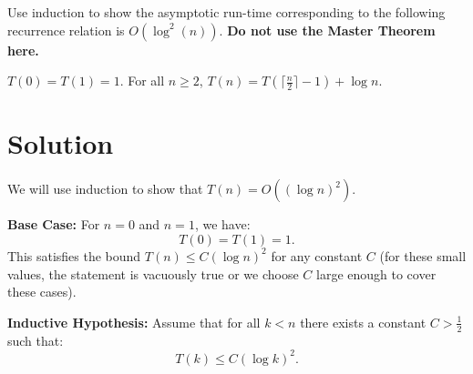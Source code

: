 \documentclass[11pt]{article}
\begin{document}
    \setlength{\headheight}{26pt}
    \pagestyle{fancy}
    \fancyfoot[C]{}
    \fancyfoot[R]{\thepage}
    \renewcommand{\headrulewidth}{0.4pt}
    \renewcommand{\footrulewidth}{0.4 pt}
    
	
    
    \begin{tcolorbox}[title={Problem 1A (Recurrence Relations — 3 Styles, 9 pts)}]
        Use induction to show the asymptotic run-time corresponding to the following recurrence relation is $O(\log^2(n))$. \textbf{Do not use the Master Theorem here.}
        \begin{center}
            $T(0) = T(1) = 1$. For all $n\geq 2$, $T(n) = T(\lceil\frac{n}{2}\rceil-1) + \log n$.
        \end{center}
    \end{tcolorbox}
    \section*{Solution}

        We will use induction to show that \( T(n)=O((\log n)^2) \).

        \textbf{Base Case:}  
        For \( n = 0 \) and \( n = 1 \), we have:
        \[
        T(0)=T(1)=1.
        \]
        This satisfies the bound \( T(n) \le C (\log n)^2 \) for any constant \( C \) 
        (for these small values, the statement is vacuously true or we choose \( C \) large enough to cover these cases).

        \textbf{Inductive Hypothesis:}  
        Assume that for all \( k < n \) there exists a constant \( C > \frac{1}{2} \) such that:
        \[
        T(k) \le C (\log k)^2.
        \]
\end{document}

